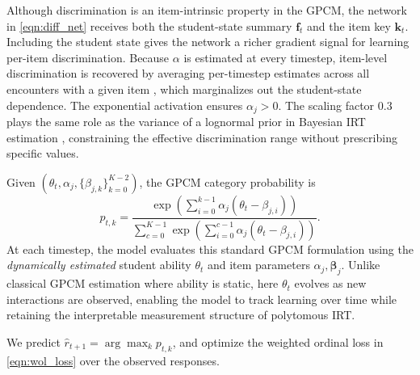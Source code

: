 \documentclass[pdflatex,sn-apa]{sn-jnl}
\begin{document}
Although discrimination is an item-intrinsic property in the GPCM, the network in \eqref{eqn:diff_net} receives both the student-state summary $\mathbf{f}_t$ and the item key $\mathbf{k}_t$. Including the student state gives the network a richer gradient signal for learning per-item discrimination. Because $\alpha$ is estimated at every timestep, item-level discrimination is recovered by averaging per-timestep estimates across all encounters with a given item \citep{meulders_person-by-item_2004}, which marginalizes out the student-state dependence. The exponential activation ensures $\alpha_j > 0$. The scaling factor $0.3$ plays the same role as the variance of a lognormal prior in Bayesian IRT estimation \citep{de_ayala_theory_2009}, constraining the effective discrimination range without prescribing specific values.

Given $(\theta_t,\alpha_j,\{\beta_{j,k}\}_{k=0}^{K-2})$, the GPCM category probability is
\begin{equation}\label{eqn:gpcm_prob}
    p_{t,k}=
    \frac{\exp\!\left(\sum_{i=0}^{k-1}\alpha_j(\theta_t-\beta_{j,i})\right)}
         {\sum_{c=0}^{K-1}\exp\!\left(\sum_{i=0}^{c-1}\alpha_j(\theta_t-\beta_{j,i})\right)}.
\end{equation}
At each timestep, the model evaluates this standard GPCM formulation using the \emph{dynamically estimated} student ability $\theta_t$ and item parameters $\alpha_j, \boldsymbol{\beta}_j$. Unlike classical GPCM estimation where ability is static, here $\theta_t$ evolves as new interactions are observed, enabling the model to track learning over time while retaining the interpretable measurement structure of polytomous IRT.

We predict $\hat{r}_{t+1}=\arg\max_k p_{t,k}$, and optimize the weighted ordinal loss in \eqref{eqn:wol_loss} over the observed responses.
\end{document}
